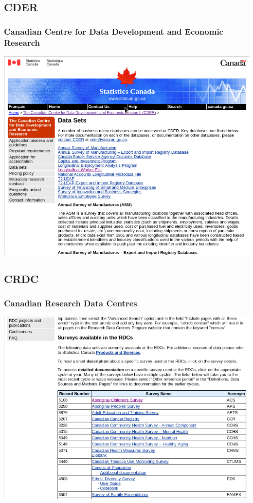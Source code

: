 \subsection{CDER}
\begin{frame}[label=CDER]
\frametitle{Canadian Centre for Data Development and Economic Research}
\includegraphics[width=\textwidth]{cder-20130804.png}
\end{frame}

\subsection{CRDC}
\begin{frame}[label=CRDC]
\frametitle{Canadian Research Data Centres}
\includegraphics[width=\textwidth]{cdn-rdc-20130804.png}
\end{frame}


